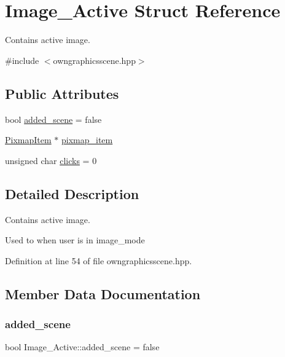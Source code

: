 \hypertarget{structImage__Active}{}\section{Image\+\_\+\+Active Struct Reference}
\label{structImage__Active}


Contains active image.  




{\ttfamily \#include $<$owngraphicsscene.\+hpp$>$}

\subsection*{Public Attributes}
\begin{DoxyCompactItemize}
\item 
bool \mbox{\hyperlink{structImage__Active_ac5eb10f5ca4ad81766c92a6ede6f7853}{added\+\_\+scene}} = false
\item 
\mbox{\hyperlink{classPixmapItem}{Pixmap\+Item}} $\ast$ \mbox{\hyperlink{structImage__Active_aa007ea3c9ba4830bbc2706af51820c20}{pixmap\+\_\+item}}
\item 
unsigned char \mbox{\hyperlink{structImage__Active_abb039226daf0372a8d88c842f5eb140f}{clicks}} = 0
\end{DoxyCompactItemize}


\subsection{Detailed Description}
Contains active image. 

Used to when user is in image\+\_\+mode 

Definition at line 54 of file owngraphicsscene.\+hpp.



\subsection{Member Data Documentation}
\mbox{\label{structImage__Active_ac5eb10f5ca4ad81766c92a6ede6f7853}} 
\subsubsection{\texorpdfstring{added\+\_\+scene}{added\_scene}}
{\footnotesize\ttfamily bool Image\+\_\+\+Active\+::added\+\_\+scene = false}

